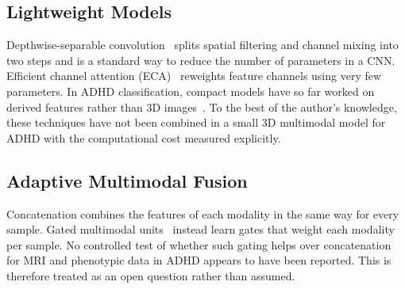\documentclass[runningheads]{llncs}
\begin{document}
\subsection{Lightweight Models}
Depthwise-separable convolution~\cite{chollet2017xception,howard2017mobilenets} splits spatial filtering and channel mixing into two steps and is a standard way to reduce the number of parameters in a CNN. Efficient channel attention (ECA)~\cite{wang2020eca} reweights feature channels using very few parameters. In ADHD classification, compact models have so far worked on derived features rather than 3D images~\cite{deepika2025}. To the best of the author's knowledge, these techniques have not been combined in a small 3D multimodal model for ADHD with the computational cost measured explicitly.

\subsection{Adaptive Multimodal Fusion}
Concatenation combines the features of each modality in the same way for every sample. Gated multimodal units~\cite{arevalo2017gmu} instead learn gates that weight each modality per sample. No controlled test of whether such gating helps over concatenation for MRI and phenotypic data in ADHD appears to have been reported. This is therefore treated as an open question rather than assumed.
\end{document}
